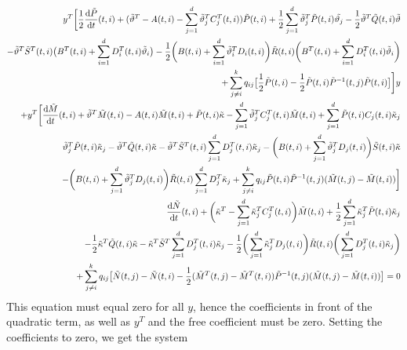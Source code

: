 \begin{align*}
    y^T \bigg[ \frac12 \frac{\mathop{}\!\mathrm{d} \Tilde{P}}{\mathop{}\!\mathrm{d} t}(t,i) + (\Tilde{\vartheta}^T - A(t,i) - \sum_{j=1}^d \Tilde{\vartheta}_j^T C_j^T(t,i))\Tilde{P}(t,i) + \frac12 \sum_{j=1}^d \Tilde{\vartheta}_j^T \Tilde{P}(t,i) \Tilde{\vartheta_j} - \frac12 \tilde{\vartheta}^T \tilde{Q}(t,i)\tilde{\vartheta}\\
    - \tilde{\vartheta}^T \tilde{S}^T(t,i) \big(B^T(t,i) + \sum_{i=1}^d D_i^T(t,i) \tilde{\vartheta}_i \big)
    - \frac12 \bigg(B(t,i) + \sum_{i=1}^d\tilde{\vartheta}_i^T D_i(t,i)\bigg) \tilde{R}(t,i) \bigg(B^T(t,i) + \sum_{i=1}^d D_i^T(t,i) \tilde{\vartheta}_i\bigg)\\
    + \sum_{j\ne i}^k q_{ij}  \big[ \frac12 \Tilde{P}(t,i) - \frac12 \Tilde{P}(t,i)\Tilde{P}^{-1}(t,j)\Tilde{P}(t,i)\big] \bigg] y\\
    + y^T \bigg[ \frac{\mathop{}\!\mathrm{d} \Tilde{M}}{\mathop{}\!\mathrm{d} t}(t,i) + \Tilde{\vartheta}^T \Tilde{M}(t,i) - A(t,i) \Tilde{M}(t,i) + \Tilde{P}(t,i) \Tilde{\kappa} - \sum_{j=1}^d \Tilde{\vartheta}_j^T C_j^T(t,i) \Tilde{M}(t,i) + \sum_{j=1}^d \Tilde{P}(t,i) C_j(t,i) \Tilde{\kappa}_j\\
    \Tilde{\vartheta}_j^T \Tilde{P}(t,i) \Tilde{\kappa}_j - \tilde{\vartheta}^T \Tilde{Q}(t,i) \Tilde{\kappa} - \Tilde{\vartheta}^T \Tilde{S}^T(t,i) \sum_{j=1}^d D_j^T(t,i) \Tilde{\kappa}_j - \bigg(B(t,i) + \sum_{j=1}^d \Tilde{\vartheta}_j^T D_j(t,i)\bigg)\Tilde{S}(t,i) \Tilde{\kappa}\\
    - \bigg( B(t,i) + \sum_{j=1}^d \Tilde{\vartheta}_j^T D_j(t,i) \bigg) \Tilde{R}(t,i) \sum_{j=1}^d D_j^T \Tilde{\kappa}_j +\sum_{j\ne i}^k q_{ij}  \Tilde{P}(t,i) \Tilde{P}^{-1}(t,j) (\Tilde{M}(t,j) - \Tilde{M}(t,i))\bigg]\\
    \frac{\mathop{}\!\mathrm{d} \Tilde{N}}{\mathop{}\!\mathrm{d} t}(t,i) + \bigg(\Tilde{\kappa}^T - \sum_{j=1}^d \Tilde{\kappa}_j^T C_j^T(t,i)\bigg) \Tilde{M}(t,i) + \frac12 \sum_{j=1}^d \Tilde{\kappa}^T_j \Tilde{P}(t,i) \Tilde{\kappa}_j \\
    - \frac12 \Tilde{\kappa}^T \Tilde{Q}(t,i) \Tilde{\kappa} - \Tilde{\kappa}^T \Tilde{S}^T \sum_{j=1}^d D_j^T(t,i) \Tilde{\kappa}_j - \frac12 \bigg(\sum_{j=1}^d \Tilde{\kappa}_j^T D_j(t,i)\bigg) \Tilde{R}(t,i) \bigg( \sum_{j=1}^d D_j^T(t,i) \Tilde{\kappa}_j\bigg)\\
    + \sum_{j\ne i}^k q_{ij} \big[ \Tilde{N}(t,j) - \Tilde{N}(t,i) - \frac12 (\Tilde{M}^T(t,j) - \Tilde{M}^T(t,i)) \Tilde{P}^{-1}(t,j)(\Tilde{M}(t,j) - \Tilde{M}(t,i)) \big] = 0
\end{align*}
This equation must equal zero for all $y$, hence the coefficients in front of the quadratic term, as well as $y^T$ and the free coefficient must be zero. Setting the coefficients to zero, we get the system
